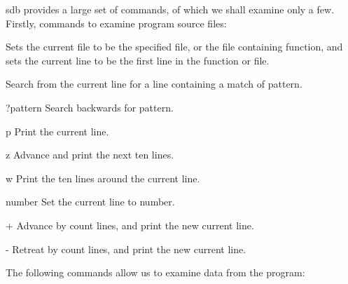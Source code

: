     {\cmd sdb} provides  a large  set of  commands, of which we shall
examine only a few. Firstly, commands to examine program source
files:
\begin{hanglist}
 Sets the  current file  to be  the specified {\ms file\/}, or the
file containing  {\ms function\/},  and sets the current line
to be the first line in the {\ms function\/} or {\ms file\/}.

 Search from  the current line  for a  line containing a match of
{\ms pattern}.

\item[\cd ?{\ms pattern\/}]
 Search backwards for {\ms pattern}.

\item[\cd p]
 Print the current line.

\item[\cd z]
 Advance and print the next ten lines.

\item[\cd w]
 Print the ten lines around the current line.

\item[\ms number\/]
 Set the current line to {\ms number\/}.

\item[\cd {\ms count\/}+]
 Advance by {\ms count\/} lines, and print the new current line.

\item[\cd {\ms count\/}-]
 Retreat by {\ms count\/} lines, and print the new current line.

\end{hanglist}
     The following commands allow us to examine data from the program:
